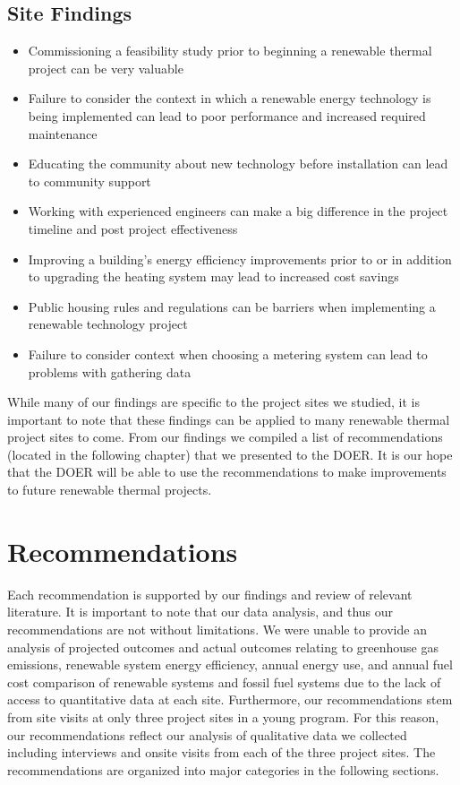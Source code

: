   \subsection*{Site Findings}
  \begin{itemize}
    \item{Commissioning a feasibility study prior to beginning a renewable thermal project can be very valuable}
    \item{Failure to consider the context in which a renewable energy technology is being implemented can lead to poor performance and increased required maintenance}
    \item{Educating the community about new technology before installation can lead to community support}
    \item{Working with experienced engineers can make a big difference in the project timeline and post project effectiveness}
    \item{Improving a building’s energy efficiency improvements prior to or in addition to upgrading the heating system may lead to increased cost savings}
    \item{Public housing rules and regulations can be barriers when implementing a renewable technology project}
    \item{Failure to consider context when choosing a metering system can lead to problems with gathering data}
  \end{itemize}
  \par While many of our findings are specific to the project sites we studied, it is important to note that these findings can be applied to many renewable thermal project sites to come. From our findings we compiled a list of recommendations (located in the following chapter) that we presented to the DOER. It is our hope that the DOER will be able to use the recommendations to make improvements to future renewable thermal projects.

\section*{Recommendations}
Each recommendation is supported by our findings and review of relevant literature. It is important to note that our data analysis, and thus our recommendations are not without limitations. We were unable to provide an analysis of projected outcomes and actual outcomes relating to greenhouse gas emissions, renewable system energy efficiency, annual energy use, and annual fuel cost comparison of renewable systems and fossil fuel systems due to the lack of access to quantitative data at each site. Furthermore, our recommendations stem from site visits at only three project sites in a young program. For this reason, our recommendations reflect our analysis of qualitative data we collected including interviews and onsite visits from each of the three project sites. The recommendations are organized into major categories in the following sections.\\

